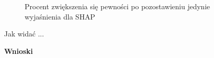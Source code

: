 \begin{figure}
\begin{minipage}[b]{0.3\textwidth}
		\caption{Procent zwiększenia się pewności po pozostawieniu jedynie wyjaśnienia dla SHAP}  \label{rys:size_confidence_womask_percent_shap}
	\end{minipage}
\end{figure}

Jak widać ...

\textbf{Wnioski}
